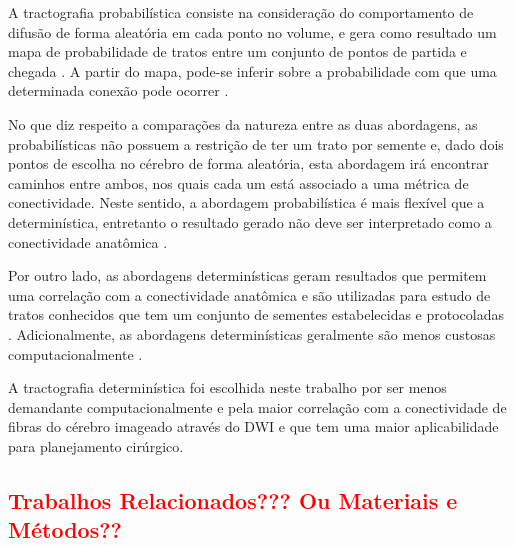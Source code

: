 \documentclass[
    12pt,                %
    oneside,            %
    a4paper,            %
    english,            %
    french,                %
    spanish,            %
    brazil                %
    ]{abntex2}
\begin{document}

A tractografia probabilística consiste na consideração do comportamento de difusão de forma aleatória em cada ponto no volume, e gera como resultado um mapa de probabilidade de tratos entre um conjunto de pontos de partida e chegada \cite{DTI_Handbook}. A partir do mapa, pode-se inferir sobre a probabilidade com que uma determinada conexão pode ocorrer \cite{tournier2011}. %

No que diz respeito a comparações da natureza entre as duas abordagens, as probabilísticas não possuem a restrição de ter um trato por semente e, dado dois pontos de escolha no cérebro de forma aleatória, esta abordagem irá encontrar caminhos entre ambos, nos quais cada um está associado a uma métrica de conectividade. Neste sentido, a abordagem probabilística é mais flexível que a determinística, entretanto o resultado gerado não deve ser interpretado como a conectividade anatômica \cite{tournier2011}. 

Por outro lado, as abordagens determinísticas geram resultados que permitem uma correlação com a conectividade anatômica e são utilizadas para estudo de tratos conhecidos que tem um conjunto de sementes estabelecidas e protocoladas \cite{tournier2011}. Adicionalmente, as abordagens determinísticas geralmente são menos custosas computacionalmente \cite{DTI_Handbook}.

A tractografia determinística foi escolhida neste trabalho por ser menos demandante computacionalmente e pela maior correlação com a conectividade de fibras do cérebro imageado através do DWI e que tem uma maior aplicabilidade para planejamento cirúrgico.

\textcolor{red}{
\chapter{Trabalhos Relacionados??? Ou Materiais e Métodos??}
\label{cap:metodos}
}

\end{document}

